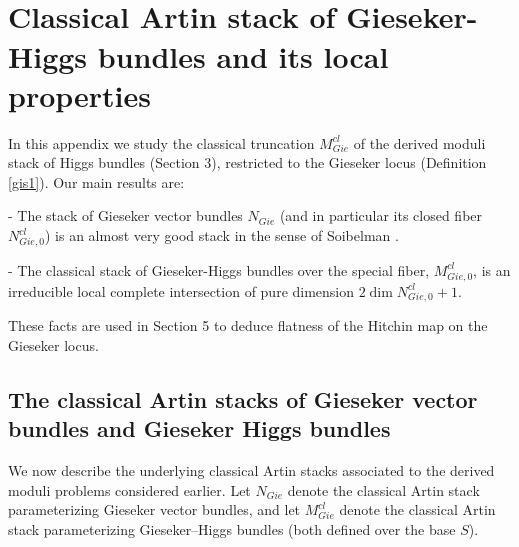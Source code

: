 \documentclass[11pt]{amsart}
\theoremstyle{plain}
\numberwithin{equation}{section}
\theoremstyle{definition}
\theoremstyle{plain}
\begin{document}
\


\
\appendix
\section{Classical Artin stack of Gieseker-Higgs bundles and its local properties}

In this appendix we study the classical truncation $M^{cl}_{Gie}$ of the derived moduli stack of Higgs bundles (Section 3), restricted to the Gieseker locus (Definition \ref{gis1}). Our main results are:

- The stack of Gieseker vector bundles $N_{Gie}$ (and in particular its closed fiber $N^{cl}_{Gie,0}$) is an almost very good stack in the sense of Soibelman \cite[Definition 2.1.2]{32e}.

- The classical stack of Gieseker-Higgs bundles over the special fiber, $M^{cl}_{Gie,0}$, is an irreducible local complete intersection of pure dimension $2\dim N^{cl}_{Gie,0} + 1$.

These facts are used in Section 5 to deduce flatness of the Hitchin map on the Gieseker locus.

\subsection{The classical Artin stacks of Gieseker vector bundles and Gieseker Higgs bundles}\label{Gies21}

We now describe the underlying classical Artin stacks associated to the derived moduli problems considered earlier. Let $N_{Gie}$ denote the classical Artin stack parameterizing Gieseker vector bundles, and let $M^{cl}_{Gie}$ denote the classical Artin stack parameterizing Gieseker–Higgs bundles (both defined over the base $S$).
\end{document}
